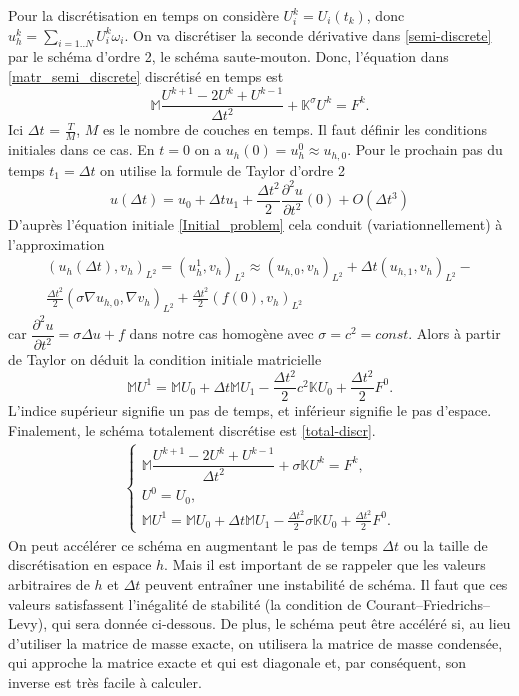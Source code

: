 \documentclass[12pt]{article}
\begin{document}
	
	Pour la discrétisation en temps on considère $U_i^k = U_i(t_k)$, donc\\ $u_h^k = \sum_{i = 1..N}U_i^k\omega_i$. On va discrétiser la seconde dérivative dans \eqref{semi-discrete} par le schéma d'ordre 2, le schéma saute-mouton. Donc, l'équation dans \eqref{matr_semi_discrete} discrétisé en temps est
	\begin{equation*}
	\mathbb{M}\dfrac{U^{k+1} - 2U^k + U^{k - 1}}{\Delta t^2} + \mathbb{K}^\sigma U^k = F^k.
	\end{equation*}
	Ici $\Delta t $ = $\frac{T}{M}$, $M$ es le nombre de couches en temps.
	Il faut définir les conditions initiales dans ce cas. En $t = 0$ on a $u_h(0) = u_h^0 \approx u_{h,0}$. Pour le prochain pas du temps $t_1 = \Delta t$ on utilise la formule de Taylor d’ordre 2
	\begin{equation*}
	u(\Delta t) = u_0 + \Delta t u_1 + \frac{\Delta t^2}{2}\frac{\partial^2u}{\partial t^2}(0) + O(\Delta t^3)
	\end{equation*}
	D'auprès l'équation initiale \eqref{Initial_problem} cela conduit (variationnellement) à l'approximation 
	\begin{multline*}
	(u_h(\Delta t), v_h)_{L^2} = (u_h^1, v_h)_{L^2} \approx (u_{h,0}, v_h)_{L^2} + \Delta t(u_{h,1},v_h)_{L^2} -\\ \frac{\Delta t^2}{2}(\sigma \nabla u_{h,0}, \nabla v_h)_{L^2} + \frac{\Delta t^2}{2} (f(0), v_h)_{L^2}
	\end{multline*}
	car $\dfrac{\partial^2u}{\partial t^2} = \sigma \Delta u + f$ dans notre cas homogène avec $\sigma = c^2 = const$.
	Alors à partir de Taylor on déduit la condition initiale matricielle
	\begin{equation*}
	\mathbb{M}U^1 = \mathbb{M}U_0 + \Delta t\mathbb{M}U_1 - \frac{\Delta t^2}{2}c^2\mathbb{K}U_0 +  \frac{\Delta t^2}{2}F^0.
	\end{equation*}
	L'indice supérieur signifie un pas de temps, et inférieur signifie le pas d'espace. Finalement, le schéma totalement discrétise est \eqref{total-discr}.
	\begin{eqnarray}
	\label{total-discr}
	\begin{cases}
	\mathbb{M}\dfrac{U^{k+1} - 2U^k + U^{k - 1}}{\Delta t^2} +\sigma \mathbb{K} U^k = F^k,\\
	U^0 = U_0,\\
	\mathbb{M}U^1 = \mathbb{M}U_0 + \Delta t\mathbb{M}U_1 - \frac{\Delta t^2}{2}\sigma \mathbb{K}U_0 +  \frac{\Delta t^2}{2}F^0.
	\end{cases}
	\end{eqnarray}
	On peut accélérer ce schéma en augmentant le pas de temps $\Delta t$ ou la taille de discrétisation en espace $h$. Mais il est important de se rappeler que les valeurs arbitraires de $h$ et $\Delta t$ peuvent entraîner une instabilité de schéma. Il faut que ces valeurs satisfassent l'inégalité de stabilité (la condition de Courant–Friedrichs–Levy), qui sera donnée ci-dessous. De plus, le schéma peut être accéléré si, au lieu d'utiliser la matrice de masse exacte, on utilisera la matrice de masse condensée, qui approche la matrice exacte et qui est diagonale et, par conséquent, son inverse est très facile à calculer.
\end{document}
